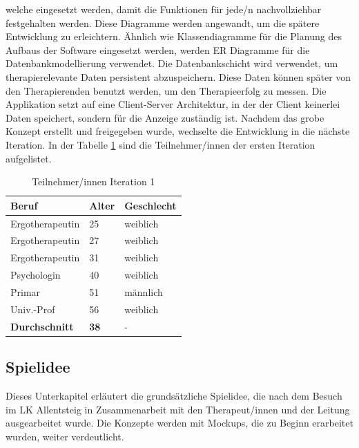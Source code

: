 welche eingesetzt werden, damit die Funktionen für jede/n nachvollziehbar festgehalten werden. Diese Diagramme werden angewandt, um die spätere Entwicklung zu erleichtern. Ähnlich wie Klassendiagramme für die Planung des Aufbaus der Software eingesetzt werden, werden \ac{ER} Diagramme für die Datenbankmodellierung verwendet. Die Datenbankschicht wird verwendet, um therapierelevante Daten persistent abzuspeichern. Diese Daten können später von den Therapierenden benutzt werden, um den Therapieerfolg zu messen. Die Applikation setzt auf eine Client-Server Architektur, in der der Client keinerlei Daten speichert, sondern für die Anzeige zuständig ist. Nachdem das grobe Konzept erstellt und freigegeben wurde, wechselte die Entwicklung in die nächste Iteration. In der Tabelle \ref{tab:serious-game-iteration} sind die Teilnehmer/innen der ersten Iteration aufgelistet.

\begin{table}[h]
    \centering
    \begin{tabular}{|l|l|l|} 
        \hline
        \rowcolor[rgb]{0.851,0.851,0.851} \textbf{Beruf} & \rowcolor[rgb]{0.851,0.851,0.851} \textbf{Alter} & \rowcolor[rgb]{0.851,0.851,0.851} \textbf{Geschlecht}  \\ 
        \hline
        Ergotherapeutin & 25 & weiblich    \\ 
        \hline
        Ergotherapeutin & 27 & weiblich    \\ 
        \hline
        Ergotherapeutin & 31 & weiblich    \\ 
        \hline
        Psychologin & 40 & weiblich    \\ 
        \hline
        Primar & 51 & männlich     \\ 
        \hline
        Univ.-Prof & 56 & weiblich     \\ 
        \hline
        \textbf{Durchschnitt}  & \textbf{38}  & -            \\
        \hline
    \end{tabular}
    \caption{Teilnehmer/innen Iteration 1}
	\label{tab:serious-game-iteration}
\end{table}

\subsection{Spielidee}

Dieses Unterkapitel erläutert die grundsätzliche Spielidee, die nach dem Besuch im LK Allentsteig in Zusammenarbeit mit den Therapeut/innen und der Leitung ausgearbeitet wurde. Die Konzepte werden mit Mockups, die zu Beginn erarbeitet wurden, weiter verdeutlicht.

